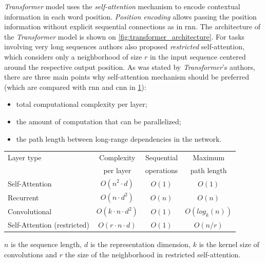 \textit{Transformer} model uses the \textit{\gls{self-attention}} mechanism
to encode contextual information in each word position.
\textit{Position encoding} allows passing the position
information without explicit sequential connections as in \acrshort{rnn}.
The architecture of the \textit{Transformer} model is shown
on \cref{fig:transformer_architecture}.
For tasks involving very long sequences authors also proposed \textit{restricted}
self-attention, which considers only a neighborhood of size $r$ in the input
sequence centered around the respective output position.
As was stated by \textit{Transformer}'s authors, there are three main points why
self-attention mechanism should be preferred
(which are compared with \acrshort{rnn} and \acrshort{cnn}
in \cref{tab:layer_complexity_comp}):
\begin{itemize}
  \item total computational complexity per layer;
  \item the amount of computation that can be parallelized;
  \item the path length between long-range dependencies in the network.
\end{itemize}

\begin{table}
\centering
\begin{tabular}{l|ccc}
\toprule
Layer type        &   Complexity             &  Sequential & Maximum        \\
                  &   per layer              &  operations & path length    \\
\midrule
Self-Attention    & $O(n^2 \cdot d)$         & $O(1)$      & $O(1)$         \\
Recurrent         & $O(n \cdot d^2)$         & $O(n)$      & $O(n)$         \\
Convolutional     & $O(k \cdot n \cdot d^2)$ & $O(1)$      & $O(log_k (n))$ \\
Self-Attention (restricted) & $O(r \cdot n \cdot d)$       & $O(1)$ & $O(n/r)$  \\
\bottomrule
\end{tabular}
 {
	$n$ is the sequence length, 
	$d$ is the representation dimension, 
	$k$ is the kernel size of convolutions and 
	$r$ the size of the neighborhood in restricted self-attention.
}
\label{tab:layer_complexity_comp}
\end{table}


